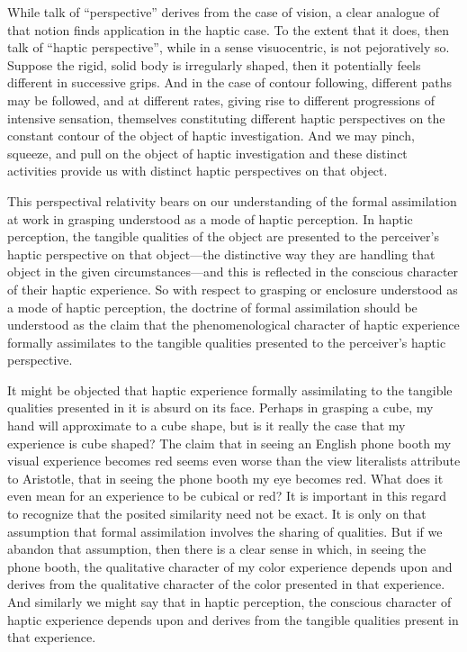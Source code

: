 \documentclass[12pt]{article}
\begin{document}
While talk of ``perspective'' derives from the case of vision, a clear analogue of that notion finds application in the haptic case. To the extent that it does, then talk of ``haptic perspective'', while in a sense visuocentric, is not pejoratively so. Suppose the rigid, solid body is irregularly shaped, then it potentially feels different in successive grips. And in the case of contour following, different paths may be followed, and at different rates, giving rise to different progressions of intensive sensation, themselves constituting different haptic perspectives on the constant contour of the object of haptic investigation. And we may pinch, squeeze, and pull on the object of haptic investigation and these distinct activities provide us with distinct haptic perspectives on that object. 

This perspectival relativity bears on our understanding of the formal assimilation at work in grasping understood as a mode of haptic perception. In haptic perception, the tangible qualities of the object are presented to the perceiver's haptic perspective on that object---the distinctive way they are handling that object in the given circumstances---and this is reflected in the conscious character of their haptic experience. So with respect to grasping or enclosure understood as a mode of haptic perception, the doctrine of formal assimilation should be understood as the claim that the phenomenological character of haptic experience formally assimilates to the tangible qualities presented to the perceiver's haptic perspective. 

It might be objected that haptic experience formally assimilating to the tangible qualities presented in it is absurd on its face. Perhaps in grasping a cube, my hand will approximate to a cube shape, but is it really the case that my experience is cube shaped? The claim that in seeing an English phone booth my visual experience becomes red seems even worse than the view literalists attribute to Aristotle, that in seeing the phone booth my eye becomes red. What does it even mean for an experience to be cubical or red? It is important in this regard to recognize that the posited similarity need not be exact. It is only on that assumption that formal assimilation involves the sharing of qualities. But if we abandon that assumption, then there is a clear sense in which, in seeing the phone booth, the qualitative character of my color experience depends upon and derives from the qualitative character of the color presented in that experience. And similarly we might say that in haptic perception, the conscious character of haptic experience depends upon and derives from the tangible qualities present in that experience. 
\end{document}
